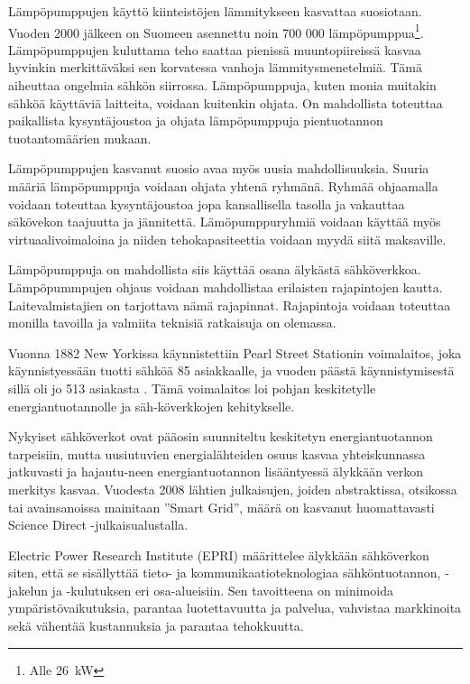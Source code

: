 Lämpöpumppujen käyttö kiinteistöjen lämmitykseen kasvattaa suosiotaan. Vuoden 2000 jälkeen on Suomeen asennettu noin 700 000 lämpöpumppua\footnote{Alle \SI{26}{\kilo\watt}}\parencite{kummu}. Lämpöpumppujen kuluttama teho saattaa pienissä muuntopiireissä kasvaa hyvinkin merkittäväksi sen korvatessa vanhoja lämmitysmenetelmiä. Tämä aiheuttaa ongelmia sähkön siirrossa. Lämpöpumppuja, kuten monia muitakin sähköä käyttäviä laitteita, voidaan kuitenkin ohjata. On mahdollista toteuttaa paikallista kysyntäjoustoa ja ohjata lämpöpumppuja pientuotannon tuotantomäärien mukaan.

Lämpöpumppujen kasvanut suosio avaa myös uusia mahdollisuuksia. Suuria määriä lämpöpumppuja voidaan ohjata yhtenä ryhmänä. Ryhmää ohjaamalla voidaan toteuttaa kysyntäjoustoa jopa kansallisella tasolla ja vakauttaa säkövekon taajuutta ja jännitettä. Lämöpumppuryhmiä voidaan käyttää myös virtuaalivoimaloina ja niiden tehokapasiteettia voidaan myydä siitä maksaville\parencite{ShenJiangLi, fischerTriebelSelinger}.

Lämpöpumppuja on mahdollista siis käyttää osana älykästä sähköverkkoa. Lämpöpummpujen ohjaus voidaan mahdollistaa erilaisten rajapintojen kautta. Laitevalmistajien on tarjottava nämä rajapinnat. Rajapintoja voidaan toteuttaa monilla tavoilla ja valmiita teknisiä ratkaisuja on olemassa.

Vuonna 1882 New Yorkissa käynnistettiin Pearl Street Stationin voimalaitos, joka käynnistyessään tuotti sähköä 85 asiakkaalle, ja vuoden päästä käynnistymisestä sillä oli jo 513 asiakasta \parencite{pearlStreetStation}. Tämä voimalaitos loi pohjan keskitetylle energiantuotannolle ja säh-köverkkojen kehitykselle.

Nykyiset sähköverkot ovat pääosin suunniteltu keskitetyn energiantuotannon tarpeisiin, mutta uusiutuvien energialähteiden osuus kasvaa yhteiskunnassa jatkuvasti ja hajautu-neen energiantuotannon lisääntyessä älykkään verkon merkitys kasvaa. Vuodesta 2008 lähtien julkaisujen, joiden abstraktissa, otsikossa tai avainsanoissa mainitaan ”Smart Grid”, määrä on kasvanut huomattavasti Science Direct -julkaisualustalla. \parencite{Tuballa&Abundo}

Electric Power Research Institute (EPRI) määrittelee älykkään sähköverkon siten, että se sisällyttää tieto- ja kommunikaatioteknologiaa sähköntuotannon, -jakelun ja -kulutuksen eri osa-alueisiin. Sen tavoitteena on minimoida ympäristövaikutuksia, parantaa luotettavuutta ja palvelua, vahvistaa markkinoita sekä vähentää kustannuksia ja parantaa tehokkuutta. \parencite{SGdefinition}


